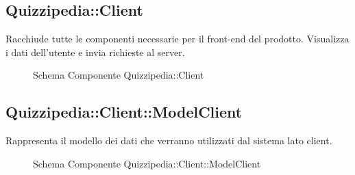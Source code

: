 \subsection{Quizzipedia::Client}
Racchiude tutte le componenti necessarie per il front-end del prodotto. Visualizza i dati dell'utente e invia richieste al server.
\begin{figure}[H]
\centering
\noindent{}
\caption[Quizzipedia::Client]{Schema Componente Quizzipedia::Client}
\end{figure}
\subsection{Quizzipedia::Client::ModelClient}
Rappresenta il modello dei dati che verranno utilizzati dal sistema lato client.
\begin{figure}[H]
\centering
\noindent{}
\caption[Quizzipedia::Client::ModelClient]{Schema Componente Quizzipedia::Client::ModelClient}
\end{figure}
